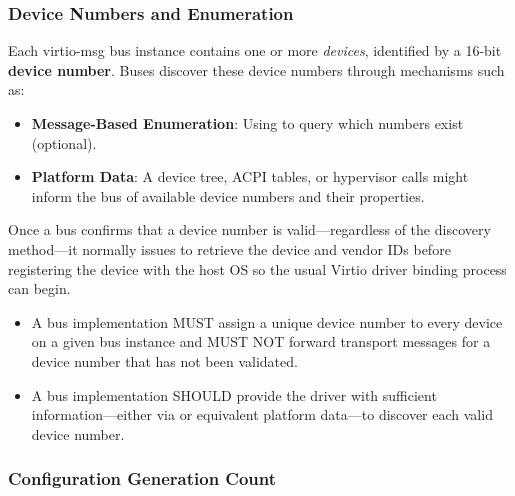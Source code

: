 \subsubsection{Device Numbers and Enumeration}
\label{sec:Virtio Transport Options / Virtio Over Messages / Basic Concepts /
Device Numbers}

Each virtio-msg bus instance contains one or more \emph{devices}, identified
by a 16-bit \textbf{device number}. Buses discover these device numbers through
mechanisms such as:
\begin{itemize}
  \item \textbf{Message-Based Enumeration}: Using  to query
        which numbers exist (optional).
  \item \textbf{Platform Data}: A device tree, ACPI tables, or hypervisor calls
        might inform the bus of available device numbers and their properties.
\end{itemize}

Once a bus confirms that a device number is valid—regardless of the discovery
method—it normally issues  to retrieve the device and
vendor IDs before registering the device with the host OS so the usual Virtio
driver binding process can begin.

\begin{itemize}
  \item A bus implementation MUST assign a unique device number to every
        device on a given bus instance and MUST NOT forward transport messages
        for a device number that has not been validated.
  \item A bus implementation SHOULD provide the driver with sufficient
        information—either via  or equivalent platform
        data—to discover each valid device number.
\end{itemize}

\subsubsection{Configuration Generation Count}
\label{sec:Virtio Transport Options / Virtio Over Messages / Basic Concepts / ConfigGen}

